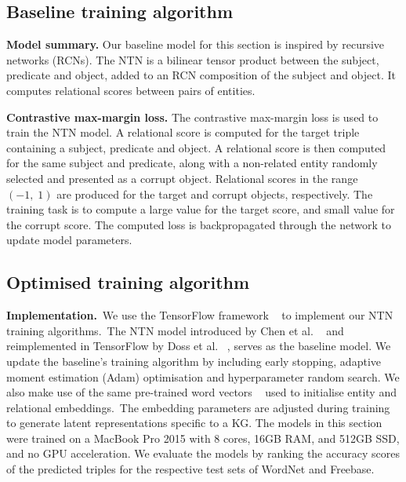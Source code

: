 \subsection{Baseline training algorithm}

\textbf{Model summary.} Our baseline model for this section is inspired by recursive networks (RCNs). The NTN is a bilinear tensor product between the subject, predicate and object, added to an RCN composition of the subject and object. It computes relational scores between pairs of entities. \par

\noindent \textbf{Contrastive max-margin loss.} The contrastive max-margin loss is used to train the NTN model. A relational score is computed for the target triple containing a subject, predicate and object. A relational score is then computed for the same subject and predicate, along with a non-related entity randomly selected and presented as a corrupt object. Relational scores in the range $ (-1, \; 1) $ are produced for the target and corrupt objects, respectively. The training task is to compute a large value for the target score, and small value for the corrupt score. The computed loss is backpropagated through the network to update model parameters. 



\subsection{Optimised training algorithm}

\textbf{Implementation.}\ We use the TensorFlow framework \unskip~\citep{abadi2016tensorflow} to implement our NTN training algorithms.\ The NTN model introduced by Chen et al. \unskip ~\citep{socher2013reasoning} and reimplemented in TensorFlow by Doss et al. \unskip ~\citep{Doss2015}, serves as the baseline model. We update the baseline's training algorithm by including early stopping, adaptive moment estimation (Adam) optimisation and hyperparameter random search. We also make use of the same pre-trained word vectors \unskip ~\citep{turian2010word} used to initialise entity and relational embeddings.\ The embedding parameters are adjusted during training to generate latent representations specific to a KG. The models in this section were trained on a MacBook Pro 2015 with 8 cores, 16GB RAM, and 512GB SSD, and no GPU acceleration. We evaluate the models by ranking the accuracy scores of the predicted triples for the respective test sets of WordNet and Freebase. \par


